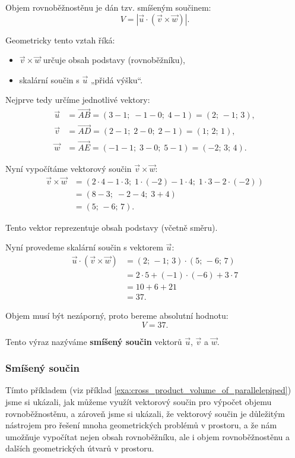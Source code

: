 \begin{example}
    Objem rovnoběžnostěnu je dán tzv. smíšeným součinem:
    \[
    V = |\vec{u} \cdot (\vec{v} \times \vec{w})|.
    \]

    Geometricky tento vztah říká:
    \begin{itemize}
        \item $\vec{v} \times \vec{w}$ určuje obsah podstavy (rovnoběžníku),
        \item skalární součin s $\vec{u}$ „přidá výšku“.
    \end{itemize}

    Nejprve tedy určíme jednotlivé vektory:
    \begin{align*}
    \vec{u} &= \overrightarrow{AB} = (3 - 1;\; -1 - 0;\; 4 - 1) = (2;\, -1;\, 3),\\
    \vec{v} &= \overrightarrow{AD} = (2 - 1;\; 2 - 0;\; 2 - 1) = (1;\, 2;\, 1),\\
    \vec{w} &= \overrightarrow{AE} = (-1 - 1;\; 3 - 0;\; 5 - 1) = (-2;\, 3;\, 4).
    \end{align*}

    Nyní vypočítáme vektorový součin $\vec{v} \times \vec{w}$:
    \begin{align*}
    \vec{v} \times \vec{w}
    &= (2 \cdot 4 - 1 \cdot 3;\; 1 \cdot (-2) - 1 \cdot 4;\; 1 \cdot 3 - 2 \cdot (-2)) \\
    &= (8 - 3;\; -2 - 4;\; 3 + 4) \\
    &= (5;\, -6;\, 7).
    \end{align*}

    Tento vektor reprezentuje obsah podstavy (včetně směru).

    Nyní provedeme skalární součin s vektorem $\vec{u}$:
    \begin{align*}
    \vec{u} \cdot (\vec{v} \times \vec{w})
    &= (2;\, -1;\, 3) \cdot (5;\, -6;\, 7) \\
    &= 2 \cdot 5 + (-1) \cdot (-6) + 3 \cdot 7 \\
    &= 10 + 6 + 21 \\
    &= 37.
    \end{align*}

    Objem musí být nezáporný, proto bereme absolutní hodnotu:
    \[
    V = 37.
    \]

    Tento výraz nazýváme \textbf{smíšený součin} vektorů $\vec{u}$, $\vec{v}$ a $\vec{w}$.


\end{example}


\subsubsection{Smíšený součin}\label{subsubsec:Complex_cross_dot_product_in_space}
Tímto příkladem (viz příklad \ref{exa:cross_product_volume_of_parallelepiped}) jsme si ukázali, jak můžeme využít vektorový součin pro výpočet objemu rovnoběžnostěnu,
a zároveň jsme si ukázali, že vektorový součin je důležitým nástrojem pro řešení mnoha geometrických problémů v prostoru,
a že nám umožňuje vypočítat nejen obsah rovnoběžníku, ale i objem rovnoběžnostěnu a dalších geometrických útvarů v prostoru.

